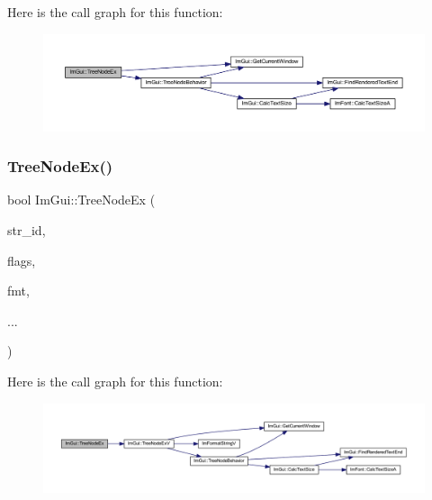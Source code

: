 Here is the call graph for this function\+:
\nopagebreak
\begin{figure}[H]
\begin{center}
\leavevmode
\includegraphics[width=350pt]{namespace_im_gui_a21f62e092dac9556a15a8edee2f70522_cgraph}
\end{center}
\end{figure}
\mbox{\label{namespace_im_gui_a9ca2fae922b38cfddc3259f874c18a5d}} 
\subsubsection{\texorpdfstring{Tree\+Node\+Ex()}{TreeNodeEx()}\hspace{0.1cm}{\footnotesize\ttfamily [2/3]}}
{\footnotesize\ttfamily bool Im\+Gui\+::\+Tree\+Node\+Ex (\begin{DoxyParamCaption}\item[{const char $\ast$}]{str\+\_\+id,  }\item[{\mbox{\hyperlink{imgui_8h_a0588fdd10c59b49a0159484fe9ec4564}{Im\+Gui\+Tree\+Node\+Flags}}}]{flags,  }\item[{const char $\ast$}]{fmt,  }\item[{}]{... }\end{DoxyParamCaption})}

Here is the call graph for this function\+:
\nopagebreak
\begin{figure}[H]
\begin{center}
\leavevmode
\includegraphics[width=350pt]{namespace_im_gui_a9ca2fae922b38cfddc3259f874c18a5d_cgraph}
\end{center}
\end{figure}
\mbox{\label{namespace_im_gui_adce362ad94baa9b00f5914cbcab00452}} 
